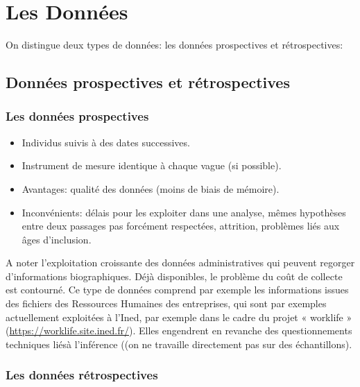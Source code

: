 \documentclass[
  12pt,
  letterpaper,
  DIV=11,
  numbers=noendperiod,
  onepage,
  openany]{scrreprt}
\providecommand{\tightlist}{%
  \setlength{\itemsep}{0pt}\setlength{\parskip}{0pt}}\usepackage{longtable,booktabs,array}
\begin{document}
\hypertarget{les-donnuxe9es}{%
\chapter{\texorpdfstring{\textbf{Les
Données}}{Les Données}}\label{les-donnuxe9es}}

On distingue deux types de données: les données prospectives et
rétrospectives:

\hypertarget{donnuxe9es-prospectives-et-ruxe9trospectives}{%
\section{\texorpdfstring{\textbf{Données prospectives et
rétrospectives}}{Données prospectives et rétrospectives}}\label{donnuxe9es-prospectives-et-ruxe9trospectives}}

\hypertarget{les-donnuxe9es-prospectives}{%
\subsection{Les données
prospectives}\label{les-donnuxe9es-prospectives}}

\begin{itemize}
\tightlist
\item
  Individus suivis à des dates successives.
\item
  Instrument de mesure identique à chaque vague (si possible).
\item
  Avantages: qualité des données (moins de biais de mémoire).\\
\item
  Inconvénients: délais pour les exploiter dans une analyse, mêmes
  hypothèses entre deux passages pas forcément respectées, attrition,
  problèmes liés aux âges d'inclusion.
\end{itemize}

A noter l'exploitation croissante des données administratives qui
peuvent regorger d'informations biographiques. Déjà disponibles, le
problème du coût de collecte est contourné. Ce type de données comprend
par exemple les informations issues des fichiers des Ressources Humaines
des entreprises, qui sont par exemples actuellement exploitées à l'Ined,
par exemple dans le cadre du projet « worklife »
(\url{https://worklife.site.ined.fr/}). Elles engendrent en revanche des
questionnements techniques liésà l'inférence ((on ne travaille
directement pas sur des échantillons).

\hypertarget{les-donnuxe9es-ruxe9trospectives}{%
\subsection{Les données
rétrospectives}\label{les-donnuxe9es-ruxe9trospectives}}
\end{document}
